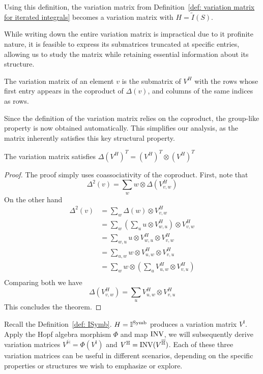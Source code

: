 Using this definition, the variation matrix from Definition~\ref{def: variation matrix for iterated integrals} becomes a variation matrix with $H=\widetilde I(S)$.

While writing down the entire variation matrix is impractical due to it profinite nature, it is feasible to express its submatrices truncated at specific entries, allowing us to study the matrix while retaining essential information about its structure.

\begin{definition}
The variation matrix of an element $v$ is the submatrix of $V^H$ with the rows whose first entry appears in the coproduct of $\Delta(v)$, and columns of the same indices as rows.
\end{definition}

Since the definition of the variation matrix relies on the coproduct, the group-like property is now obtained automatically. This simplifies our analysis, as the matrix inherently satisfies this key structural property.

\begin{theorem}\label{thm: Coassociativity of variation matrix}
The variation matrix satisfies $\Delta(V^H)^T=(V^H)^T\otimes (V^H)^T$
\end{theorem}

\begin{proof}
The proof simply uses coassociativity of the coproduct. First, note that
\[
\Delta^2(v)=\sum_ww\otimes \Delta(V^H_{v,w})
\]
On the other hand
\begin{align*}
\Delta^2(v)&=\sum_w\Delta(w)\otimes V^H_{v,w}\\
&=\sum_w\left(\sum_uu\otimes V^H_{w,u}\right)\otimes V^H_{v,w}\\
&=\sum_{w,u}u\otimes V^H_{w,u}\otimes V^H_{v,w}\\
&=\sum_{u,w}w\otimes V^H_{u,w}\otimes V^H_{v,u}\\
&=\sum_{w}w\otimes\left(\sum_u V^H_{u,w}\otimes V^H_{v,u}\right)\\
\end{align*}
Comparing both we have
\begin{equation}
\Delta(V^H_{v,w})=\sum_u V^H_{u,w}\otimes V^H_{v,u}
\end{equation}
This concludes the theorem.
\end{proof}

Recall the Definition~\ref{def: ISymb}. $H=\mathbb I^{\operatorname{Symb}}$ produces a variation matrix $V^{\mathbb I}$. Apply the Hopf algebra morphism $\Phi$ and map $\operatorname{INV}$, we will subsequently derive variation matrices $V^{\overline{\mathbb H}}=\Phi(V^{\mathbb I})$ and $V^{\mathbb H}=\operatorname{INV}(V^{\overline{\mathbb H}})$. Each of these three variation matrices can be useful in different scenarios, depending on the specific properties or structures we wish to emphasize or explore.

